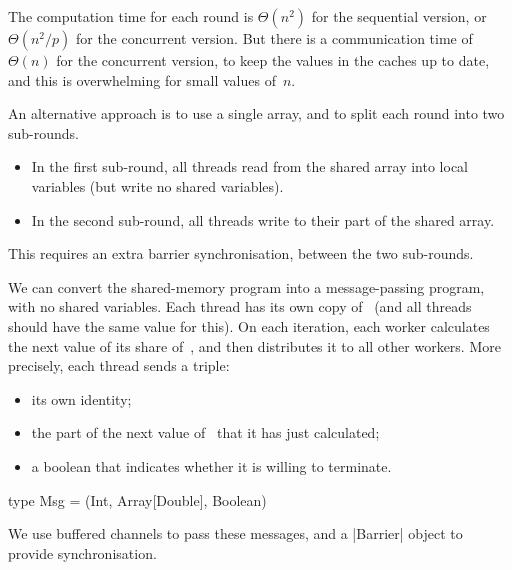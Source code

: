 
\begin{selfnote}
The computation time for each round is $\Theta(n^2)$ for the sequential
version, or $\Theta(n^2/p)$ for the concurrent version.  But there is a
communication time of $\Theta(n)$ for the concurrent version, to keep the
values in the caches up to date, and this is overwhelming for small values
of~$n$.
\end{selfnote}


\begin{slide}

An alternative approach is to use a single array, and to split each round
into two sub-rounds. 
\begin{itemize}
\item In the first sub-round, all threads read from the shared array into
  local variables (but write no shared variables).

\item In the second sub-round, all threads write to their part of the shared
  array. 
\end{itemize}
%
This requires an extra barrier synchronisation, between the two sub-rounds. 
\end{slide}


\begin{slide}

We can convert the shared-memory program into a message-passing program,
with no shared variables.  Each thread has its own copy of~ (and all
threads should have the same value for this).  On each iteration, each
worker calculates the next value of its share of~, and then
distributes it to all other workers.  More precisely, each thread sends a
triple:
%
\begin{itemize}
\item 
its own identity;

\item
the part of the next value of~ that it has just calculated;

\item
a boolean that indicates whether it is willing to terminate.
\end{itemize}
%
\begin{scala}
type Msg = (Int, Array[Double], Boolean)
\end{scala}

We use buffered channels to pass these messages, and a |Barrier| object to
provide synchronisation.
\end{slide}

